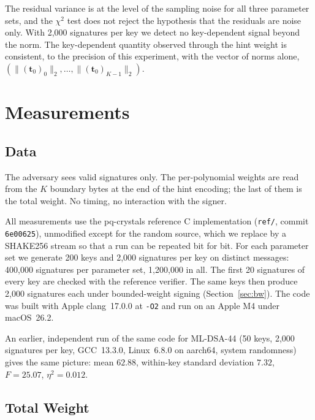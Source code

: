 \documentclass{article}
\newcommand{\tzero}{\mathbf{t}_0}
\begin{document}
\noindent
The residual variance is at the level of the sampling noise for all three
parameter sets, and the $\chi^2$ test does not reject the hypothesis that the
residuals are noise only.  With 2,000 signatures per key we detect no
key-dependent signal beyond the norm.  The key-dependent quantity observed
through the hint weight is consistent, to the precision of this experiment, with
the vector of norms alone, $(\|(\tzero)_0\|_2, \ldots, \|(\tzero)_{K-1}\|_2)$.

\section{Measurements}
\label{sec:l1}

\subsection{Data}
\label{sec:data}

The adversary sees valid signatures only.  The per-polynomial weights are read
from the $K$ boundary bytes at the end of the hint encoding; the last of them
is the total weight.  No timing, no interaction with the signer.

All measurements use the pq-crystals reference C implementation (\texttt{ref/},
commit \texttt{6e00625}), unmodified except for the random source, which we
replace by a SHAKE256 stream so that a run can be repeated bit for bit.  For
each parameter set we generate 200 keys and 2,000 signatures per key on
distinct messages: 400,000 signatures per parameter set, 1,200,000 in all.
The first 20 signatures of every key are checked with the reference verifier.
The same keys then produce 2,000 signatures each under bounded-weight signing
(Section~\ref{sec:bw}).  The code was built with Apple clang~17.0.0 at
\texttt{-O2} and run on an Apple M4 under macOS~26.2.

An earlier, independent run of the same code for ML-DSA-44 (50 keys, 2,000
signatures per key, GCC~13.3.0, Linux~6.8.0 on aarch64, system randomness)
gives the same picture: mean $62.88$, within-key standard deviation $7.32$,
$F = 25.07$, $\eta^2 = 0.012$.

\subsection{Total Weight}
\end{document}
